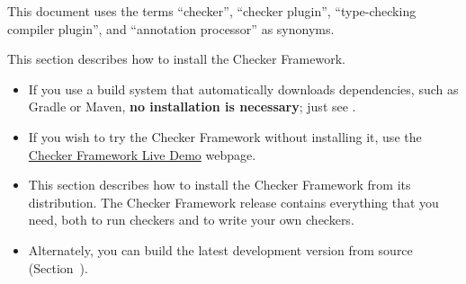 





This document uses the terms ``checker'', ``checker plugin'',
``type-checking compiler plugin'', and ``annotation processor'' as
synonyms.


This section describes how to install the Checker Framework.
\begin{itemize}
\item
If you use a build system that automatically downloads dependencies,
such as Gradle or Maven, \textbf{no installation is necessary}; just see
.
\item
If you wish to try the Checker Framework without installing it, use the
\href{http://eisop.uwaterloo.ca/live/}{Checker Framework Live Demo} webpage.
\item
This section describes how to install the Checker Framework from its
distribution.  The Checker Framework release contains everything that you
need, both to run checkers and to write your own checkers.
\item
Alternately, you can build the latest development version from source
(Section~).
\end{itemize}


